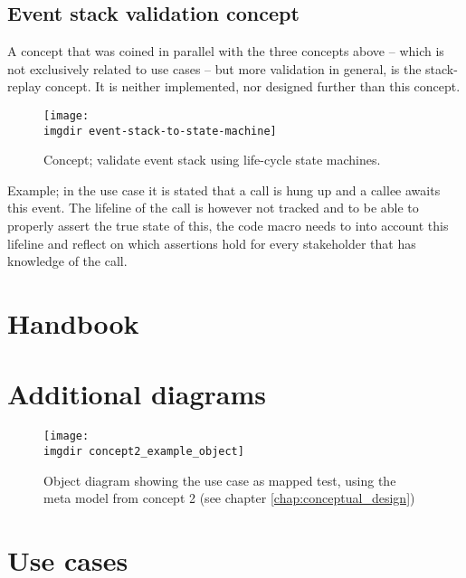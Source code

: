 \section{Event stack validation concept}
\label{sec:event-stack-validation}
A concept that was coined in parallel with the three concepts above -- which is not exclusively related to use cases -- but more validation in general, is the stack-replay concept. It is neither implemented, nor designed further than this concept.
\begin{figure}[ht]
\centering
\texttt{[image: \\imgdir event-stack-to-state-machine]}
\caption{Concept; validate event stack using life-cycle state machines.}
\label{fig:event-stack-to-state-machine}
\end{figure}
Example; in the use case it is stated that a call is hung up and a callee awaits this event. The lifeline of the call is however not tracked and to be able to properly assert the true state of this, the code macro needs to into account this lifeline and reflect on which assertions hold for every stakeholder that has knowledge of the call. %





\chapter{Handbook}

\chapter{Additional diagrams}

\begin{figure}[!htbp]
  \centering
  \texttt{[image: \\imgdir concept2\_example\_object]}
  \caption{Object diagram showing the use case as mapped test, using the meta model from concept 2 (see chapter \ref{chap:conceptual_design})}
  \label{fig:concept2_example_object}
\end{figure}

\chapter{Use cases}
\label{appendix:use-cases}


